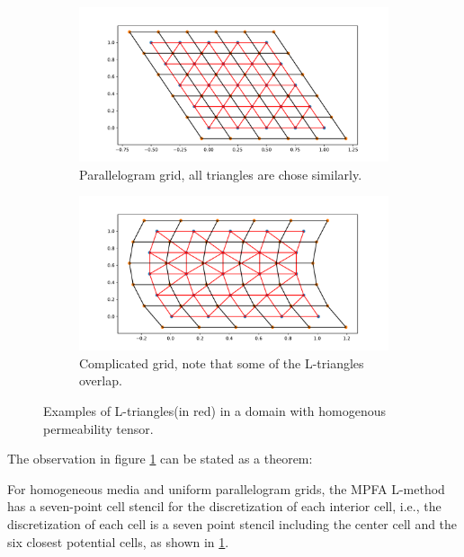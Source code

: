 \documentclass[../Main/main.tex]{subfiles}
\begin{document}
	\begin{figure}[H]
		\centering
		\begin{subfigure}[b]{0.8\textwidth}
			\centering
			\includegraphics[width=\textwidth]{L-triangles_paralellogram.pdf}
			\caption{Parallelogram grid, all triangles are chose similarly.}
			\label{fig:paralellogram-L}
		\end{subfigure}
		\hfill
		\begin{subfigure}[b]{0.8\textwidth}
			\centering
			\includegraphics[width=\textwidth]{L-triangles_complex.pdf}
			\caption{Complicated grid, note that some of the L-triangles overlap.}
			\label{fig:complicated-L}
		\end{subfigure}
		\caption{Examples of L-triangles(in red) in a domain with homogenous permeability tensor.}
		\label{fig:L-triangles}
	\end{figure}
	The observation in figure \ref{fig:paralellogram-L} can be stated as a theorem:
	\begin{theorem}
		\label{th:L_triangulation}
		For homogeneous media and uniform parallelogram grids, the MPFA L-method
		has a seven-point cell stencil for the discretization of each interior cell, i.e., the discretization of each cell is a seven point stencil including the center cell and the six closest potential cells, as shown in \ref{fig:paralellogram-L}.
	\end{theorem}
\end{document}
